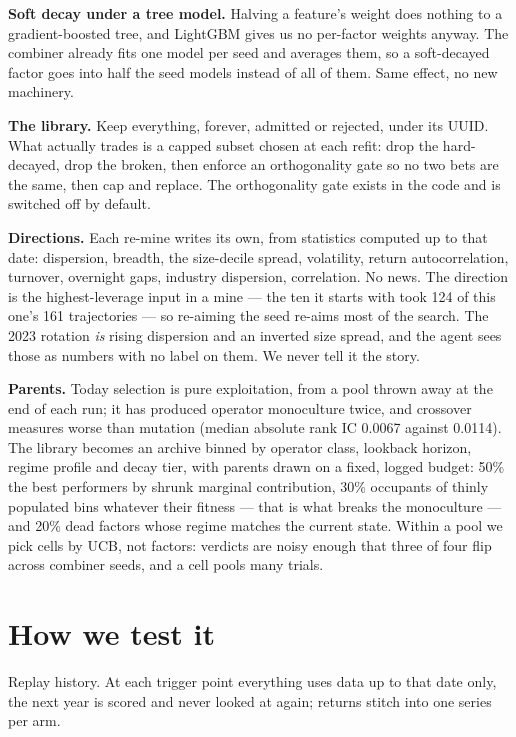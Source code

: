 \documentclass[11pt]{article}
\begin{document}
\textbf{Soft decay under a tree model.} Halving a feature's weight does nothing to
a gradient-boosted tree, and LightGBM gives us no per-factor weights anyway. The
combiner already fits one model per seed and averages them, so a soft-decayed
factor goes into half the seed models instead of all of them. Same effect, no new
machinery.

\textbf{The library.} Keep everything, forever, admitted or rejected, under its
UUID. What actually trades is a capped subset chosen at each refit: drop the
hard-decayed, drop the broken, then enforce an orthogonality gate so no two bets
are the same, then cap and replace. The orthogonality gate exists in the code and
is switched off by default.

\textbf{Directions.} Each re-mine writes its own, from statistics computed up to
that date: dispersion, breadth, the size-decile spread, volatility, return
autocorrelation, turnover, overnight gaps, industry dispersion, correlation. No
news. The direction is the highest-leverage input in a mine --- the ten it starts
with took 124 of this one's 161 trajectories --- so re-aiming the seed re-aims most
of the search. The 2023 rotation \emph{is} rising dispersion and an inverted size
spread,
and the agent sees those as numbers with no label on them. We never tell it the
story.

\textbf{Parents.} Today selection is pure exploitation, from a pool thrown away at
the end of each run; it has produced operator monoculture twice, and crossover
measures worse than mutation (median absolute rank IC 0.0067 against 0.0114). The
library becomes an archive binned by operator class, lookback horizon, regime
profile and decay tier, with parents drawn on a fixed, logged budget: 50\% the best
performers by shrunk marginal contribution, 30\% occupants of thinly populated bins
whatever their fitness --- that is what breaks the monoculture --- and 20\% dead
factors whose regime matches the current state. Within a pool we pick cells by UCB,
not factors: verdicts are noisy enough that three of four flip across combiner
seeds, and a cell pools many trials.

\section{How we test it}

Replay history. At each trigger point everything uses data up to that date only, the
next year is scored and never looked at again; returns stitch into one series per
arm.
\end{document}
